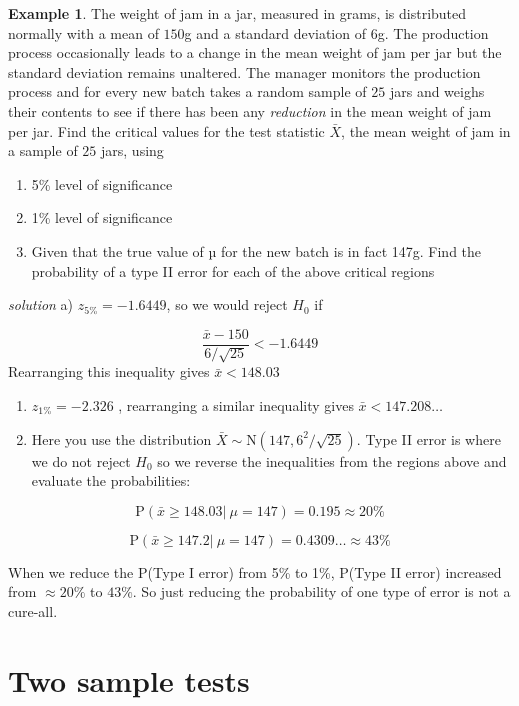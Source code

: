 \documentclass[
]{book}
\theoremstyle{definition}
\theoremstyle{definition}
\newtheorem{example}{Example}[chapter]
\theoremstyle{definition}
\theoremstyle{definition}
\theoremstyle{remark}
\begin{document}
\begin{example}
The weight of jam in a jar, measured in grams, is distributed normally with a mean of \(150\)g and a standard deviation of \(6\)g. The production process occasionally leads to a change in the mean weight of jam per jar but the standard deviation remains unaltered. The manager monitors the production process and for every new batch takes a random sample of \(25\) jars and weighs their contents to see if there has been any \emph{reduction} in the mean weight of jam per jar.
Find the critical values for the test statistic \(\bar{X}\), the mean weight of jam in a sample of \(25\) jars, using

\begin{enumerate}
\def\labelenumi{\alph{enumi})}
\item
  5\% level of significance
\item
  1\% level of significance
\item
  Given that the true value of µ for the new batch is in fact 147g. Find the probability of a type II error for each of the above critical regions
\end{enumerate}

\emph{solution}
a) \(z_{5\%} = -1.6449\), so we would reject \(H_0\) if

\[\frac{\bar{x}-150}{6/\sqrt{25}}<-1.6449 \]
Rearranging this inequality gives \(\bar{x} < 148.03\)

\begin{enumerate}
\def\labelenumi{\alph{enumi})}
\setcounter{enumi}{1}
\item
  \(z_{1\%} = -2.326\) , rearranging a similar inequality gives \(\bar{x} < 147.208\ldots\)
\item
  Here you use the distribution \(\bar{X}\sim\text{N}(147, 6^2/\sqrt{25})\). Type II error is where we do not reject \(H_0\) so we reverse the inequalities from the regions above and evaluate the probabilities:
\end{enumerate}

\[\text{P}(\bar{x} \geq 148.03 | \ \mu = 147) = 0.195 \approx 20\%\]

\[\text{P}(\bar{x} \geq 147.2 | \ \mu = 147) = 0.4309\ldots \approx 43\%\]
\end{example}

When we reduce the P(Type I error) from 5\% to 1\%, P(Type II error) increased from \(\approx 20\%\) to \(43\%\). So just reducing the probability of one type of error is not a cure-all.

\hypertarget{two-sample-tests}{%
\section{Two sample tests}\label{two-sample-tests}}
\end{document}
